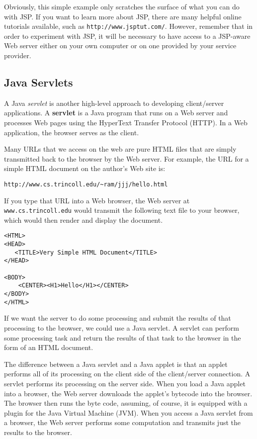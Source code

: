 Obviously, this simple example only scratches the surface of what you
can do with JSP.  If you want to learn more about JSP, there are many
helpful online tutorials available, such as {\tt http://www.jsptut.com/}.
However, remember that in order to experiment with JSP, it will be
necessary to have access to a JSP-aware Web server either on your
own computer or on one provided by your service provider.

\subsection{Java Servlets}

A Java {\em servlet} is another high-level approach to developing
client/server applications.  A {\bf servlet} is a Java program that
runs on a Web server and processes Web pages using the HyperText
Transfer Protocol (HTTP).  In a Web application, the browser serves as
the client.

Many URLs that we access on the web are pure HTML files that are
simply transmitted back to the browser by the Web server.  For
example, the URL for a simple HTML document on the author's Web site
is:

\begin{jjjlisting}
\begin{lstlisting}[commentstyle=\color{black}]
http://www.cs.trincoll.edu/~ram/jjj/hello.html
\end{lstlisting}
\end{jjjlisting}

\noindent If you type that URL into a Web browser, the Web server at
{\tt www.cs.trincoll.edu} would transmit the following text file
to your browser, which would then render and display the document.

\begin{jjjlisting}
\begin{lstlisting}
<HTML>
<HEAD>  
   <TITLE>Very Simple HTML Document</TITLE>
</HEAD>

<BODY>
    <CENTER><H1>Hello</H1></CENTER>
</BODY>
</HTML>
\end{lstlisting}
\end{jjjlisting}

\noindent If we want the server to do some processing and submit the
results of that processing to the browser, we could use a Java
servlet.  A servlet can perform some processing task and return the
results of that task to the browser in the form of an HTML document.

The difference between a Java servlet and a Java applet is that
 an applet performs all of its processing
on the client side of the client/server connection. A servlet performs
its processing on the server side.  When you load a Java applet into a
browser, the Web server downloads the applet's bytecode into the
browser.  The browser then runs the byte code, assuming, of course, it
is equipped with a plugin for the Java Virtual Machine (JVM).  When
you access a Java servlet from a browser, the Web server performs some
computation and transmits just the results to the browser.

